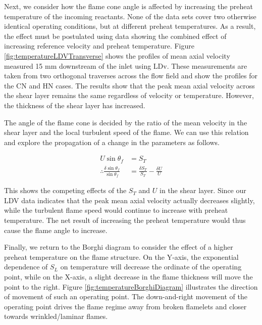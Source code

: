 Next, we consider how the flame cone angle is affected by increasing the preheat temperature of the incoming reactants.
None of the data sets cover two otherwise identical operating conditions, but at different preheat temperatures.
As a result, the effect must be postulated using data showing the combined effect of increasing reference velocity and preheat temperature.
Figure \ref{fig:temperatureLDVTransverse} shows the profiles of mean axial velocity measured 15 mm downstream of the inlet using LDv.
These measurements are taken from two orthogonal traverses across the flow field and show the profiles for the CN and HN cases.
The results show that the peak mean axial velocity across the shear layer remains the same regardless of velocity or temperature.
However, the thickness of the shear layer has increased.



The angle of the flame cone is decided by the ratio of the mean velocity in the shear layer and the local turbulent speed of the flame.
We can use this relation and explore the propagation of a change in the parameters as follows.

\begin{align}
  U \sin \theta_f &= S_T \nonumber \\
  \therefore \frac{ \delta \sin \theta_f }{ \sin \theta_f } &= \frac{ \delta S_T }{ S_T } - \frac{ \delta U }{ U }
\end{align}

This shows the competing effects of the \(S_T\) and \(U\) in the shear layer.
Since our LDV data indicates that the peak mean axial velocity actually decreases slightly, while the turbulent flame speed would continue to increase with preheat temperature.
The net result of increasing the preheat temperature would thus cause the flame angle to increase.

Finally, we return to the Borghi diagram to consider the effect of a higher preheat temperature on the flame structure.
On the Y-axis, the exponential dependence of \(S_L\) on temperature will decrease the ordinate of the operating point, while on the X-axis, a slight decrease in the flame thickness will move the point to the right.
Figure \ref{fig:temperatureBorghiDiagram} illustrates the direction of movement of such an operating point.
The down-and-right movement of the operating point drives the flame regime away from broken flamelets and closer towards wrinkled/laminar flames.



